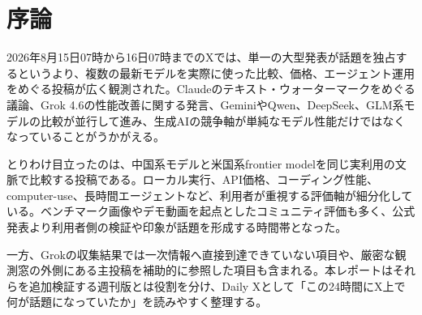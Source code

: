 \section*{序論}

2026年8月15日07時から16日07時までのXでは、単一の大型発表が話題を独占するというより、複数の最新モデルを実際に使った比較、価格、エージェント運用をめぐる投稿が広く観測された。Claudeのテキスト・ウォーターマークをめぐる議論、Grok 4.6の性能改善に関する発言、GeminiやQwen、DeepSeek、GLM系モデルの比較が並行して進み、生成AIの競争軸が単純なモデル性能だけではなくなっていることがうかがえる。

とりわけ目立ったのは、中国系モデルと米国系frontier modelを同じ実利用の文脈で比較する投稿である。ローカル実行、API価格、コーディング性能、computer-use、長時間エージェントなど、利用者が重視する評価軸が細分化している。ベンチマーク画像やデモ動画を起点としたコミュニティ評価も多く、公式発表より利用者側の検証や印象が話題を形成する時間帯となった。

一方、Grokの収集結果では一次情報へ直接到達できていない項目や、厳密な観測窓の外側にある主投稿を補助的に参照した項目も含まれる。本レポートはそれらを追加検証する週刊版とは役割を分け、Daily Xとして「この24時間にX上で何が話題になっていたか」を読みやすく整理する。
